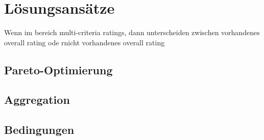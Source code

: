\section{Lösungsansätze}
Wenn im bereich multi-criteria ratings, dann unterscheiden zwischen vorhandenes overall rating ode rnicht vorhandenes overall rating

\subsection{Pareto-Optimierung}

\subsection{Aggregation}

\subsection{Bedingungen}

